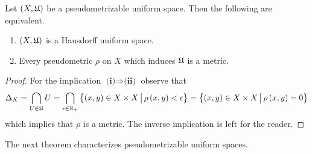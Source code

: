 \begin{fact}\label{fact:Hausdorff_and_pseudometrizable_is_metrizable}
Let $(X,{\mathfrak U})$ be a pseudometrizable uniform space. Then the following are equivalent.
\begin{enumerate}[label=\emph{\textbf{(\roman*)}}, leftmargin=*]
\item $(X,{\mathfrak U})$ is a Hausdorff uniform space.
\item Every pseudometric $\rho$ on $X$ which induces ${\mathfrak U}$ is a metric.
\end{enumerate} 
\end{fact}
\begin{proof}
For the implication $\textbf{(i)}\Rightarrow \textbf{(ii)}$ observe that
$$\Delta_X = \bigcap_{U\in {\mathfrak U}}U =  \bigcap_{\epsilon \in {\mathbb R}_+}\big\{(x,y)\in X\times X\,\big|\,\rho\left(x,y\right) < \epsilon\big\} = \big\{(x,y)\in X\times X\,\big|\,\rho\left(x,y\right) = 0\big\}$$
which implies that $\rho$ is a metric. The inverse implication is left for the reader.
\end{proof}
\noindent
The next theorem characterizes pseudometrizable uniform spaces.


